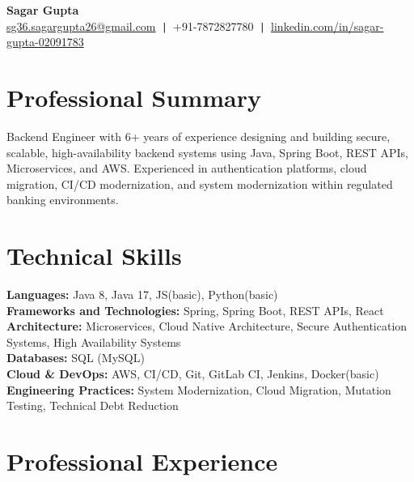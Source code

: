 \documentclass[10pt,a4paper]{article}
\begin{document}
\begin{center}
    {\LARGE \textbf{Sagar Gupta}} \\[4pt]
    \href{mailto:sg36.sagargupta26@gmail.com}{sg36.sagargupta26@gmail.com}\texttt{ | }+91-7872827780\texttt{ | }\href{https://linkedin.com/in/sagar-gupta-02091783}{linkedin.com/in/sagar-gupta-02091783}
\end{center}

\section*{Professional Summary}
 Backend Engineer with 6+ years of experience designing and building secure, scalable, high-availability backend systems using Java, Spring Boot, REST APIs, Microservices, and AWS. Experienced in authentication platforms, cloud migration, CI/CD modernization, and system modernization within regulated banking environments.

\section*{Technical Skills}
\textbf{Languages:} Java 8, Java 17, JS(basic), Python(basic) \\
\textbf{Frameworks and Technologies:} Spring, Spring Boot, REST APIs, React \\
\textbf{Architecture:} Microservices, Cloud Native Architecture, Secure Authentication Systems, High Availability Systems \\
\textbf{Databases:} SQL (MySQL)\\
\textbf{Cloud \& DevOps:} AWS, CI/CD, Git, GitLab CI, Jenkins, Docker(basic) \\
\textbf{Engineering Practices:} System Modernization, Cloud Migration, Mutation Testing, Technical Debt Reduction

\section*{Professional Experience}
\end{document}
